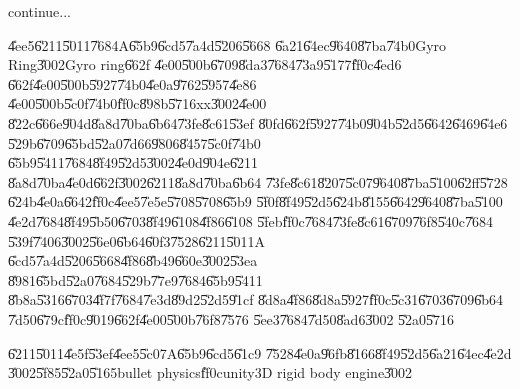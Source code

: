 continue...

\clearpage%

\begin{case}
\U{4ee5}\U{6211}\U{5011}\U{7684}A\U{65b9}\U{6cd5}\U{7a4d}\U{5206}\U{5668}%
\U{6a21}\U{64ec}\U{9640}\U{87ba}\U{74b0}Gyro Ring\U{3002}Gyro ring\U{662f}%
\U{4e00}\U{500b}\U{6709}\U{8da3}\U{7684}\U{73a9}\U{5177}\U{ff0c}\U{4ed6}%
\U{662f}\U{4e00}\U{500b}\U{5927}\U{74b0}\U{4e0a}\U{9762}\U{5957}\U{4e86}%
\U{4e00}\U{500b}\U{5c0f}\U{74b0}\U{ff0c}\U{898b}\U{5716}xx\U{3002}\U{4e00}%
\U{822c}\U{666e}\U{904d}\U{8a8d}\U{70ba}\U{6b64}\U{73fe}\U{8c61}\U{53ef}%
\U{80fd}\U{662f}\U{5927}\U{74b0}\U{904b}\U{52d5}\U{6642}\U{6469}\U{64e6}%
\U{529b}\U{6709}\U{65bd}\U{52a0}\U{7d66}\U{9806}\U{8457}\U{5c0f}\U{74b0}%
\U{65b9}\U{5411}\U{7684}\U{8f49}\U{52d5}\U{3002}\U{4e0d}\U{904e}\U{6211}%
\U{8a8d}\U{70ba}\U{4e0d}\U{662f}\U{3002}\U{6211}\U{8a8d}\U{70ba}\U{6b64}%
\U{73fe}\U{8c61}\U{8207}\U{5c07}\U{9640}\U{87ba}\U{5100}\U{62ff}\U{5728}%
\U{624b}\U{4e0a}\U{6642}\U{ff0c}\U{4ee5}\U{7e5e}\U{5708}\U{5708}\U{65b9}%
\U{5f0f}\U{8f49}\U{52d5}\U{624b}\U{8155}\U{6642}\U{9640}\U{87ba}\U{5100}%
\U{4e2d}\U{7684}\U{8f49}\U{5b50}\U{6703}\U{8f49}\U{6108}\U{4f86}\U{6108}%
\U{5feb}\U{ff0c}\U{7684}\U{73fe}\U{8c61}\U{6709}\U{76f8}\U{540c}\U{7684}%
\U{539f}\U{7406}\U{3002}\U{56e0}\U{6b64}\U{60f3}\U{7528}\U{6211}\U{5011}A%
\U{6cd5}\U{7a4d}\U{5206}\U{5668}\U{4f86}\U{8b49}\U{660e}\U{3002}\U{53ea}%
\U{8981}\U{65bd}\U{52a0}\U{7684}\U{529b}\U{77e9}\U{7684}\U{65b9}\U{5411}%
\U{8b8a}\U{5316}\U{6703}\U{4f7f}\U{7684}\U{7e3d}\U{89d2}\U{52d5}\U{91cf}%
\U{8d8a}\U{4f86}\U{8d8a}\U{5927}\U{ff0c}\U{5c31}\U{6703}\U{6709}\U{6b64}%
\U{7d50}\U{679c}\U{ff0c}\U{9019}\U{662f}\U{4e00}\U{500b}\U{76f8}\U{7576}%
\U{5ee3}\U{7684}\U{7d50}\U{8ad6}\U{3002}\newline
\U{52a0}\U{5716}
\end{case}

\begin{case}
\U{6211}\U{5011}\U{4e5f}\U{53ef}\U{4ee5}\U{5c07}A\U{65b9}\U{6cd5}\U{61c9}%
\U{7528}\U{4e0a}\U{96fb}\U{8166}\U{8f49}\U{52d5}\U{6a21}\U{64ec}\U{4e2d}%
\U{3002}\U{5f85}\U{52a0}\U{5165}bullet physics\U{ff0c}unity3D rigid body
engine\U{3002}
\end{case}

\clearpage%

